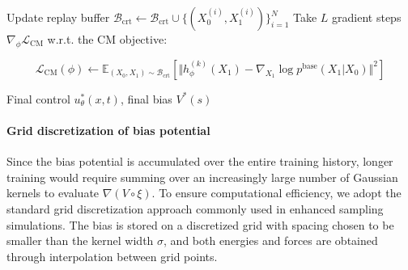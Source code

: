 \documentclass[]{fairmeta}
\theoremstyle{remark}
\begin{document}
\begin{algorithm}[!ht]
\begin{algorithmic}[1]
        \State Update replay buffer $\mathcal{B}_\text{crt} \gets \mathcal{B}_\text{crt} \cup \{(X_0^{(i)}, X_1^{(i)})\}_{i=1}^N$
        \State Take $L$ gradient steps $\nabla_\phi \mathcal{L}_\text{CM}$ w.r.t. the CM objective: \\
        \begin{minipage}{\textwidth}
        \begin{equation}
        \textstyle
        \mathcal{L}_\text{CM}(\phi) \gets \mathbb{E}_{(X_0, X_1) \sim \mathcal{B}_\text{crt}} \left[ \Vert h_\phi^{(k)}(X_1) - \nabla_{X_1} \log p^\text{base}(X_1 | X_0) \Vert^2 \right]
        \end{equation}
        \end{minipage}
    \EndFor
\EndFor
\vspace{1ex}
\State \Output Final control $u^\ast_\theta(x, t)$, final bias $V^\ast(s)$
\end{algorithmic}
\end{algorithm}

\paragraph{Grid discretization of bias potential}
Since the bias potential is accumulated over the entire training history, longer training would require summing over an increasingly large number of Gaussian kernels to evaluate $\nabla(V \circ \xi)$.
To ensure computational efficiency, we adopt the standard grid discretization approach commonly used in enhanced sampling simulations.
The bias is stored on a discretized grid with spacing chosen to be smaller than the kernel width $\sigma$, and both energies and forces are obtained through interpolation between grid points.
\end{document}
